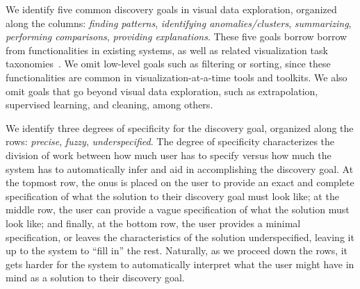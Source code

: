 \par
 We identify five 
common discovery goals in visual data exploration, organized
along the columns:
{\em finding patterns}, {\em identifying anomalies/clusters}, {\em summarizing}, 
{\em performing comparisons}, {\em providing explanations}.
These five goals borrow borrow from functionalities in existing
systems, as well as related visualization task taxonomies~\cite{Heer2012,Amar2005}.
We omit low-level goals such as filtering or sorting, since
these functionalities are common in 
visualization-at-a-time tools and toolkits.
We also omit goals that go beyond visual data exploration,
such as extrapolation, supervised learning, and cleaning, among others. 

\par 
 We identify three degrees of specificity
for the discovery goal, organized along the rows:
{\em precise}, {\em fuzzy}, {\em underspecified}.
The degree of specificity characterizes the division
of work between how much user has to specify
versus how much the system has to automatically
infer and aid in accomplishing the discovery goal. 
At the topmost row, the onus is placed on the user
to provide an exact and complete specification of 
what the solution to their discovery
goal must look like;
at the middle row, the user can provide
a vague specification of what the solution must look like;
and finally, at the bottom row,
the user provides a minimal specification, or
leaves the characteristics of the solution underspecified,
leaving it up to the system to ``fill in'' the rest.
Naturally, as we proceed down the rows,
it gets harder for the system to automatically
interpret what the user might have in mind as a solution
to their discovery goal.


